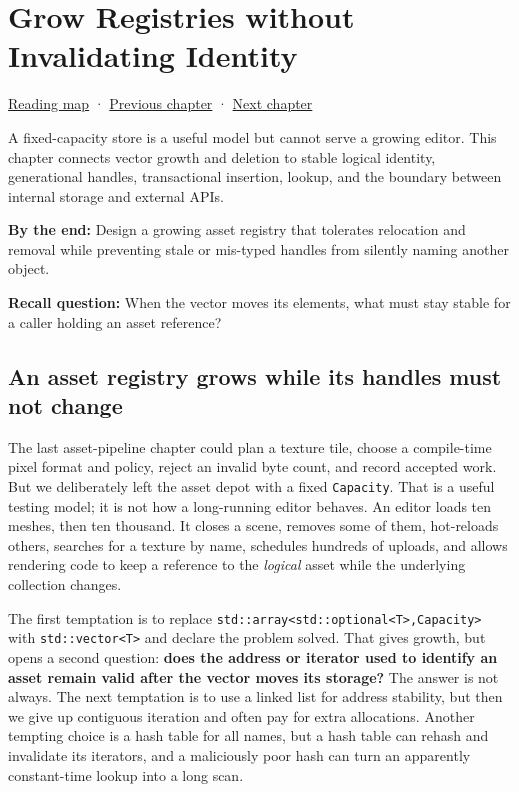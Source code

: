\hypertarget{01-foundations-i-ch006}{}
\chapter{Grow Registries without Invalidating Identity}\label{01-foundations-i-ch006-grow-registries-without-invalidating-identity}

\hyperref[volume-reading-map]{Reading map} · \hyperref[01-foundations-i-ch005-generic-asset-pipelines-without-hidden-contracts]{Previous chapter} · \hyperref[01-foundations-i-ch007-typed-interfaces-identity-and-data-structures]{Next chapter}

A fixed-capacity store is a useful model but cannot serve a growing editor. This chapter connects vector growth and deletion to stable logical identity, generational handles, transactional insertion, lookup, and the boundary between internal storage and external APIs.

\textbf{By the end:} Design a growing asset registry that tolerates relocation and removal while preventing stale or mis-typed handles from silently naming another object.

\textbf{Recall question:} When the vector moves its elements, what must stay stable for a caller holding an asset reference?

\section{An asset registry grows while its handles must not change}\label{01-foundations-i-ch006-an-asset-registry-grows-while-its-handles-must-not-change}

The last asset-pipeline chapter could plan a texture tile, choose a compile-time pixel format and policy, reject an invalid byte count, and record accepted work. But we deliberately left the asset depot with a fixed \texttt{Capacity}. That is a useful testing model; it is not how a long-running editor behaves. An editor loads ten meshes, then ten thousand. It closes a scene, removes some of them, hot-reloads others, searches for a texture by name, schedules hundreds of uploads, and allows rendering code to keep a reference to the \emph{logical} asset while the underlying collection changes.

The first temptation is to replace \texttt{std::array\textless{}std::optional\textless{}T\textgreater{},Capacity\textgreater{}} with \texttt{std::vector\textless{}T\textgreater{}} and declare the problem solved. That gives growth, but opens a second question: \textbf{does the address or iterator used to identify an asset remain valid after the vector moves its storage?} The answer is not always. The next temptation is to use a linked list for address stability, but then we give up contiguous iteration and often pay for extra allocations. Another tempting choice is a hash table for all names, but a hash table can rehash and invalidate its iterators, and a maliciously poor hash can turn an apparently constant-time lookup into a long scan.

